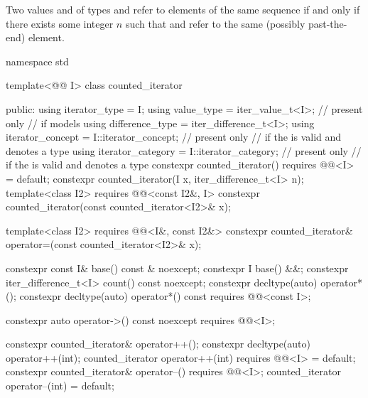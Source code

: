 \pnum
Two values  and  of types
and
refer to elements of the same sequence if and only if
there exists some integer $n$ such that
and
refer to the same (possibly past-the-end) element.

%
\begin{codeblock}
namespace std {
  template<@@ I>
  class counted_iterator {
  public:
    using iterator_type = I;
    using value_type = iter_value_t<I>;                         // present only
                        // if  models 
    using difference_type = iter_difference_t<I>;
    using iterator_concept = I::iterator_concept;               // present only
                        // if the   is valid and denotes a type
    using iterator_category = I::iterator_category;             // present only
                        // if the   is valid and denotes a type
    constexpr counted_iterator() requires @@<I> = default;
    constexpr counted_iterator(I x, iter_difference_t<I> n);
    template<class I2>
      requires @@<const I2&, I>
        constexpr counted_iterator(const counted_iterator<I2>& x);

    template<class I2>
      requires @@<I&, const I2&>
        constexpr counted_iterator& operator=(const counted_iterator<I2>& x);

    constexpr const I& base() const & noexcept;
    constexpr I base() &&;
    constexpr iter_difference_t<I> count() const noexcept;
    constexpr decltype(auto) operator*();
    constexpr decltype(auto) operator*() const
      requires @@<const I>;

    constexpr auto operator->() const noexcept
      requires @@<I>;

    constexpr counted_iterator& operator++();
    constexpr decltype(auto) operator++(int);
    counted_iterator operator++(int)
      requires @@<I> = default;
    constexpr counted_iterator& operator--()
      requires @@<I>;
    counted_iterator operator--(int) = default;

}}
\end{codeblock}
